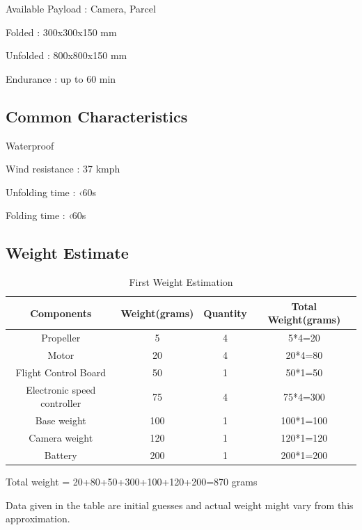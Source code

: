 Available Payload : Camera, Parcel

Folded : 300x300x150 mm

Unfolded : 800x800x150 mm

Endurance : up to 60 min

\subsection{Common Characteristics}

Waterproof

Wind resistance : 37 kmph

Unfolding time : ‹60s

Folding time : ‹60s

\subsection{Weight Estimate}
\begin{table}[h!]
 \begin{center}
 \begin{tabular}{|c| c |c |c|} 
 \hline
 Components & Weight(grams) & Quantity & Total Weight(grams) \\ [0.5ex] 
 \hline
 Propeller & 5 & 4 & 5*4=20 \\ 
 \hline
 Motor & 20 & 4 & 20*4=80 \\
 \hline
 Flight Control Board & 50  & 1 & 50*1=50 \\
 \hline
 Electronic speed controller & 75 & 4 & 75*4=300 \\ 
 \hline
 Base weight & 100 & 1 & 100*1=100 \\ 
 \hline
 Camera weight & 120 & 1 & 120*1=120 \\ 
 \hline
 Battery & 200 & 1 & 200*1=200 \\ 
 \hline
\end{tabular}
\caption{\label{table:weight_estimatio}First Weight Estimation}
\end{center}

\end{table}
Total weight = 20+80+50+300+100+120+200=870 grams

Data given in the table are initial guesses and actual weight might vary from this approximation.


